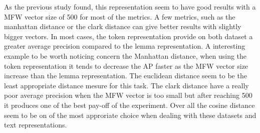 As the previous study found, this representation seem to have good results with a MFW vector size of 500 for most of the metrics.
A few metrics, such as the manhattan distance or the clark distance can give better results with slightly bigger vectors.
In most cases, the token representation provide on both dataset a greater average precision compared to the lemma representation.
A interesting example to be worth noticing concern the Manhattan distance, when using the token representation it tends to decrease the AP faster as the MFW vector size increase than the lemma representation.
The euclidean distance seem to be the least appropriate distance mesure for this task.
The clark distance have a really poor average precision when the MFW vector is too small but after reaching 500 it produces one of the best pay-off of the experiment.
Over all the cosine distance seem to be on of the most approriate choice when dealing with these datasets and text representations.

